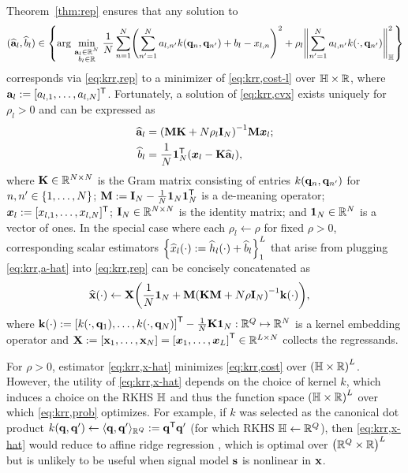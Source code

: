 Theorem~\ref{thm:rep} ensures that any solution to 
\begin{align}
	(\est{\bma}_l,\est{b}_l) \in 
	\set{\argmin{\substack{\bma_l \in \reals{N} \\ b_l \in \real}} 
		\frac{1}{N} \sum_{n=1}^N \paren{\sum_{n'=1}^N a_{l,n'} k(\bmq_n,\bmq_{n'}) 
		+ b_l - x_{l,n}}^2 +
		\rho_l \norm{\sum_{n'=1}^N a_{l,n'} k(\cdot,\bmq_{n'})}^2_\hilb}
	\label{eq:krr,cvx}
\end{align}
corresponds via \eqref{eq:krr,rep} 
to a minimizer of \eqref{eq:krr,cost-l}
over $\mathbb{H} \times \mathbb{R}$,
where $\mathbf{a}_l := [a_{l,1},\dots,a_{l,N}]^{\mathsf{T}}$.
Fortunately, a solution of \eqref{eq:krr,cvx} exists uniquely
for $\rho_l > 0$
and can be expressed as
\begin{align}
	\est{\bma}_l &= \inv{\bmM \bmK + N\rho_l\eye{N}} \bmM \bmxg{l};
	\label{eq:krr,a-hat} \\
	\est{b}_l &= \frac{1}{N} \ones{N}\tpose \paren{\bmxg{l} - \bmK \est{\bma}_l},
	\label{eq:krr,b-hat}
\end{align}
where 
$\mathbf{K} \in \mathbb{R}^{N \times N}$ is the Gram matrix 
consisting of entries $k(\mathbf{q}_n,\mathbf{q}_{n'})$ for $n,n' \in \set{1,\dots,N}$;
$\mathbf{M} := \mathbf{I}_{N}-\frac{1}{N}\boldsymbol{1}_{N}\boldsymbol{1}_{N}^{\mathsf{T}}$ is a de-meaning operator;
$\boldsymbol{x}_{l} := [x_{l,1},\dots,x_{l,N}]^{\mathsf{T}}$;
$\mathbf{I}_{N} \in \mathbb{R}^{N \times N}$ is the identity matrix;
and $\boldsymbol{1}_{N} \in \mathbb{R}^{N}$ is a vector of ones.
In the special case where each
$\rho_l \gets \rho$ 
for fixed $\rho>0$, 
corresponding scalar estimators 
$\set{\est{x}_l\paren{\cdot} := \est{h}_l\paren{\cdot} + \est{b}_l}_1^L$
that arise from plugging \eqref{eq:krr,a-hat} into \eqref{eq:krr,rep}
can be concisely concatenated as
\begin{align}
	\bmxha{\cdot} &\gets \bmX 
		\paren{\frac{1}{N}\ones{N} + 
		\bmM\inv{\bmK\bmM + N\rho\eye{N}} \bmka{\cdot}},
		\label{eq:krr,x-hat}
\end{align}
where
$\bmka{\cdot} := 
\brac{k(\cdot,\bmq_1),\dots,k(\cdot,\bmq_N)}\tpose - \frac{1}{N}\bmK\ones{N}
: \reals{Q} \mapsto \reals{N}$
is a kernel embedding operator and 
$\bmX := \brac{\bmx_1,\dots,\bmx_N} = \brac{\bmxg{1},\dots,\bmxg{L}}\tpose 
\in \reals{L \times N}$
collects the regressands. 

For $\rho>0$, 
estimator \eqref{eq:krr,x-hat} minimizes \eqref{eq:krr,cost}
over $\paren{\hilb \times \real}^L$.
However, the utility of \eqref{eq:krr,x-hat}
depends on the choice of kernel $k$,
which induces a choice on the RKHS $\mathbb{H}$
and thus the function space $\paren{\hilb \times \real}^L$
over which \eqref{eq:krr,prob} optimizes.
For example, if $k$ was selected as the canonical dot product 
$k(\mathbf{q},\mathbf{q}') \gets \langle \mathbf{q},\mathbf{q}' \rangle_{\mathbb{R}^{Q}} := \mathbf{q}^{\mathsf{T}} \mathbf{q}'$
(for which RKHS $\mathbb{H} \gets \mathbb{R}^{Q}$),
then \eqref{eq:krr,x-hat} would reduce 
to affine ridge regression \cite{hoerl:70:rrb},
which is optimal over $\paren{\reals{Q} \times \real}^L$
but is unlikely to be useful when signal model $\mathbf{s}$ is nonlinear in $\mathbf{x}$.


